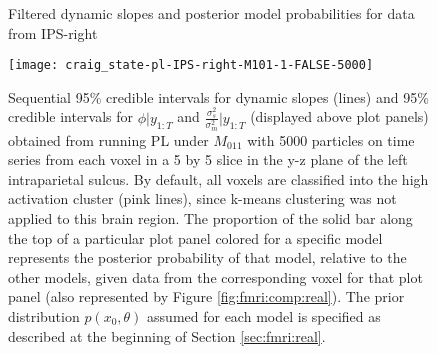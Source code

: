 
\begin{figure}
\ssp
\centering
\caption{Filtered dynamic slopes and posterior model probabilities for data from IPS-right} \label{fig:fmri:slopes:real:IPSr}
\texttt{[image: craig\_state-pl-IPS-right-M101-1-FALSE-5000]}
\caption*{Sequential 95\% credible intervals for dynamic slopes (lines) and 95\% credible intervals for $\phi|y_{1:T}$ and $\frac{\sigma^2_s}{\sigma^2_m}|y_{1:T}$ (displayed above plot panels) obtained from running PL under $M_{011}$ with 5000 particles on time series from each voxel in a 5 by 5 slice in the y-z plane of the left intraparietal sulcus. By default, all voxels are classified into the high activation cluster (pink lines), since k-means clustering was not applied to this brain region. The proportion of the solid bar along the top of a particular plot panel colored for a specific model represents the posterior probability of that model, relative to the other models, given data from the corresponding voxel for that plot panel (also represented by Figure \ref{fig:fmri:comp:real}). The prior distribution $p(x_0,\theta)$ assumed for each model is specified as described at the beginning of Section \ref{sec:fmri:real}.}
\end{figure}

